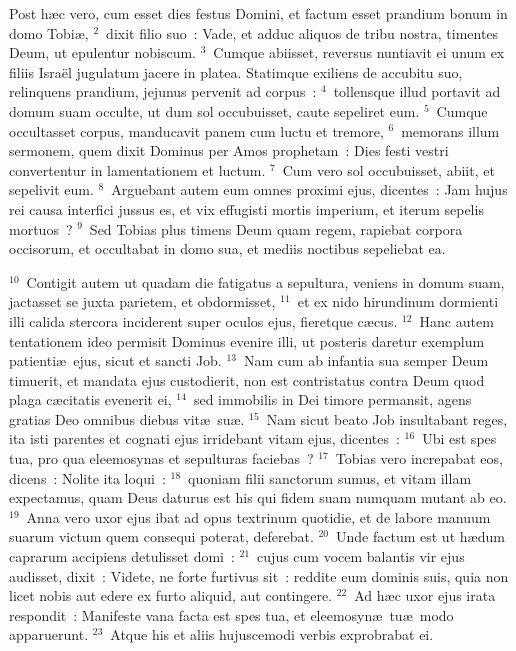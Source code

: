 \lettrine[lines=10,image=true,loversize=0.05,lraise=-0.03]{P}{}ost h\ae c vero, cum esset dies festus Domini, et factum esset prandium bonum in domo Tobi\ae ,
${}^{2}$~dixit filio suo~: Vade, et adduc aliquos de tribu nostra, timentes Deum, ut epulentur nobiscum.
${}^{3}$~Cumque abiisset, reversus nuntiavit ei unum ex filiis Isra\"el jugulatum jacere in platea. Statimque exiliens de accubitu suo, relinquens prandium, jejunus pervenit ad corpus~:
${}^{4}$~tollensque illud portavit ad domum suam occulte, ut dum sol occubuisset, caute sepeliret eum.
${}^{5}$~Cumque occultasset corpus, manducavit panem cum luctu et tremore,
${}^{6}$~memorans illum sermonem, quem dixit Dominus per Amos prophetam~: Dies festi vestri convertentur in lamentationem et luctum.
${}^{7}$~Cum vero sol occubuisset, abiit, et sepelivit eum.
${}^{8}$~Arguebant autem eum omnes proximi ejus, dicentes~: Jam hujus rei causa interfici jussus es, et vix effugisti mortis imperium, et iterum sepelis mortuos~?
${}^{9}$~Sed Tobias plus timens Deum quam regem, rapiebat corpora occisorum, et occultabat in domo sua, et mediis noctibus sepeliebat ea.


${}^{10}$~Contigit autem ut quadam die fatigatus a sepultura, veniens in domum suam, jactasset se juxta parietem, et obdormisset,
${}^{11}$~et ex nido hirundinum dormienti illi calida stercora inciderent super oculos ejus, fieretque c\ae cus.
${}^{12}$~Hanc autem tentationem ideo permisit Dominus evenire illi, ut posteris daretur exemplum patienti\ae\ ejus, sicut et sancti Job.
${}^{13}$~Nam cum ab infantia sua semper Deum timuerit, et mandata ejus custodierit, non est contristatus contra Deum quod plaga c\ae citatis evenerit ei,
${}^{14}$~sed immobilis in Dei timore permansit, agens gratias Deo omnibus diebus vit\ae\ su\ae .
${}^{15}$~Nam sicut beato Job insultabant reges, ita isti parentes et cognati ejus irridebant vitam ejus, dicentes~:
${}^{16}$~Ubi est spes tua, pro qua eleemosynas et sepulturas faciebas~?
${}^{17}$~Tobias vero increpabat eos, dicens~: Nolite ita loqui~:
${}^{18}$~quoniam filii sanctorum sumus, et vitam illam expectamus, quam Deus daturus est his qui fidem suam numquam mutant ab eo.
${}^{19}$~Anna vero uxor ejus ibat ad opus textrinum quotidie, et de labore manuum suarum victum quem consequi poterat, deferebat.
${}^{20}$~Unde factum est ut h\ae dum caprarum accipiens detulisset domi~:
${}^{21}$~cujus cum vocem balantis vir ejus audisset, dixit~: Videte, ne forte furtivus sit~: reddite eum dominis suis, quia non licet nobis aut edere ex furto aliquid, aut contingere.
${}^{22}$~Ad h\ae c uxor ejus irata respondit~: Manifeste vana facta est spes tua, et eleemosyn\ae\ tu\ae\ modo apparuerunt.
${}^{23}$~Atque his et aliis hujuscemodi verbis exprobrabat ei.

